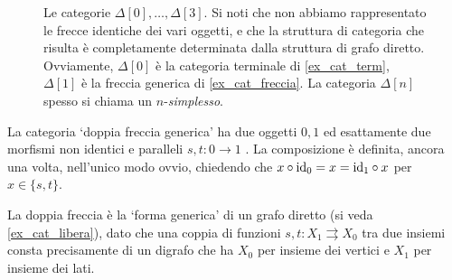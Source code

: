 \begin{example}
\begin{figure}[h]
\begin{center}
		\end{center}
		\caption{Le categorie \(\Delta[0], \dots,\Delta[3]\). Si noti che non abbiamo rappresentato le frecce identiche dei vari oggetti, e che la struttura di categoria che risulta è completamente determinata dalla struttura di grafo diretto. Ovviamente, \(\Delta[0]\) è la categoria terminale di \ref{ex_cat_term}, \(\Delta[1]\) è la freccia generica di \ref{ex_cat_freccia}. La categoria \(\Delta[n]\) spesso si chiama un \(n\)-\emph{simplesso}.}
		\label{fig:le_delta}
	\end{figure}
\end{example}
\begin{example}\label{ex_cat_doppiafreccia}
	La categoria `doppia freccia generica' ha due oggetti \(0,1\) ed esattamente due morfismi non identici e paralleli \(s,t : 0\to 1\)%
	. La composizione è definita, ancora una volta, nell'unico modo ovvio, chiedendo che \(x\circ \mathrm{id}_0=x=\mathrm{id}_1\circ x\) per \(x\in\{s,t\}\).

	La doppia freccia è la `forma generica' di un grafo diretto (si veda \ref{ex_cat_libera}), dato che una coppia di funzioni \(s,t: X_1 \rightrightarrows X_0\) tra due insiemi consta precisamente di un digrafo che ha \(X_0\) per insieme dei vertici e \(X_1\) per insieme dei lati.
\end{example}
